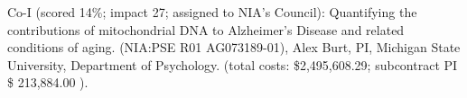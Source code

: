 

\item Co-I (scored 14\%; impact 27; assigned to NIA's Council): Quantifying the contributions of mitochondrial DNA to Alzheimer's Disease and related conditions of aging. (NIA:PSE R01 AG073189-01), Alex Burt, PI, Michigan State University, Department of Psychology.  (total costs: \$2,495,608.29; subcontract PI \$ 213,884.00 ).


